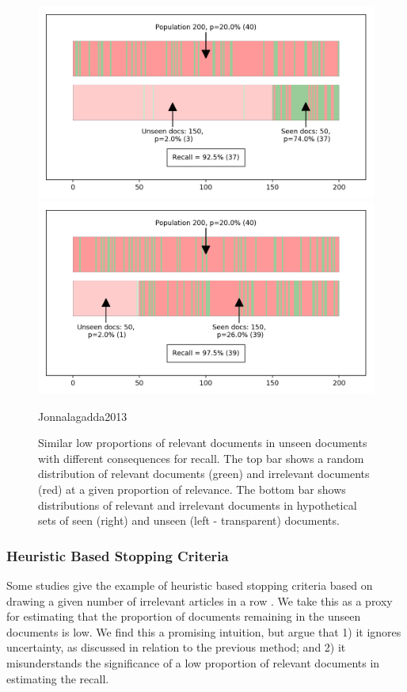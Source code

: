 \documentclass{bmcart}
\begin{document}
\begin{figure}
	\includegraphics[width=\linewidth]{../images/proportions_1.png}
	\includegraphics[width=\linewidth]{../images/proportions_2.png}
	\caption{Similar low proportions of relevant documents in unseen documents with different consequences for recall. The top bar shows a random distribution of relevant documents (green) and irrelevant documents (red) at a given proportion of relevance. The bottom bar  shows distributions of relevant and irrelevant documents in hypothetical sets of seen (right) and unseen (left - transparent) documents.}Jonnalagadda2013
	\label{unseen-proportions}
\end{figure}


		
\subsubsection*{Heuristic Based Stopping Criteria}

Some studies give the example of heuristic based stopping criteria based on drawing a given number of irrelevant articles in a row \cite{Jonnalagadda2013, Przybya2018}. 
We take this as a proxy for estimating that the proportion of documents remaining in the unseen documents is low. 
We find this a promising intuition, but argue that 1) it ignores uncertainty, as discussed in relation to the previous method; and 2) it misunderstands the significance of a low proportion of relevant documents in estimating the recall.
\end{document}
